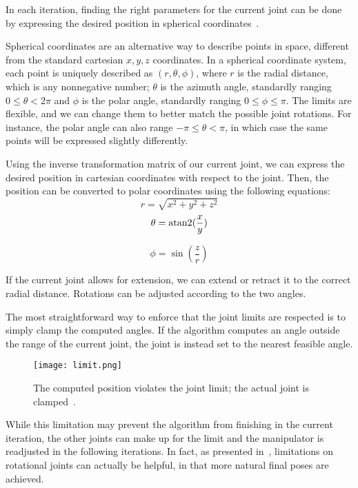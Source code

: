 In each iteration, finding the right parameters for the current joint can be done by expressing the desired position in spherical coordinates~\cite{spherical}.

Spherical coordinates are an alternative way to describe points in space, different from the standard cartesian $x, y, z$ coordinates. In a spherical coordinate system, each point is uniquely described as $(r, \theta, \phi)$, where $r$ is the radial distance, which is any nonnegative number; $\theta$ is the azimuth angle, standardly ranging $0 \leq \theta < 2\pi$ and $\phi$ is the polar angle, standardly ranging $0 \leq \phi \leq \pi$. The limits are flexible, and we can change them to better match the possible joint rotations. For instance, the polar angle can also range $-\pi \le \theta < \pi$, in which case the same points will be expressed slightly differently.

Using the inverse transformation matrix of our current joint, we can express the desired position in cartesian coordinates with respect to the joint. Then, the position can be converted to polar coordinates using the following equations:
\begin{equation}
  r = \sqrt{x^2 + y^2 + z^2}
\end{equation}
\begin{equation}
  \theta = \operatorname{atan2}(\frac{x}{y})
\end{equation}

\begin{equation}
  \phi = \sin(\frac{z}{r})
\end{equation}

If the current joint allows for extension, we can extend or retract it to the correct radial distance. Rotations can be adjusted according to the two angles.

The most straightforward way to enforce that the joint limits are respected is to simply clamp the computed angles. If the algorithm computes an angle outside the range of the current joint,
the joint is instead set to the nearest feasible angle.

\begin{figure}[h]
    \centering
    \texttt{[image: limit.png]}
    \caption{The computed position violates the joint limit; the actual joint is clamped~\cite{Ondika2021thesis}.}\label{fig:break}
\end{figure}

While this limitation may prevent the algorithm from finishing in the current iteration, the other joints can make up for the limit and the manipulator is readjusted in the following iterations. In fact, as presented in~\cite{fabrik}, limitations on rotational joints can actually be helpful, in that more natural final poses are achieved.

